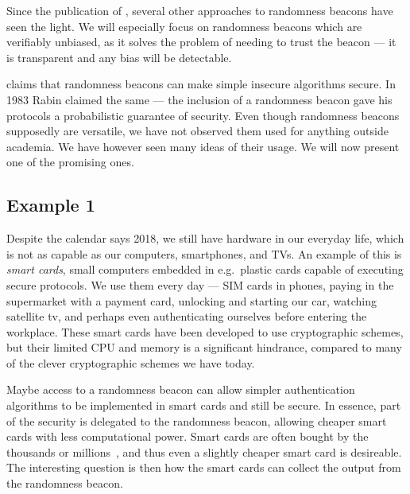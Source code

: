 Since the publication of , several other approaches to randomness beacons have seen the light.
We will especially focus on randomness beacons which are verifiably unbiased, as it solves the problem of needing to trust the beacon --- it is transparent and any bias will be detectable.

 claims that randomness beacons can make simple insecure algorithms secure.
In 1983 Rabin claimed the same --- the inclusion of a randomness beacon gave his protocols a probabilistic guarantee of security.
Even though randomness beacons supposedly are versatile, we have not observed them used for anything outside academia.
We have however seen many ideas of their usage. We will now present one of the promising ones.

\subsection{Example 1}

Despite the calendar says 2018, we still have
hardware in our everyday life, which is not as capable as our computers, smartphones, and TVs.
An example of this is \emph{smart cards}, small computers embedded in e.g.\ plastic cards capable of executing secure protocols.
We use them every day --- SIM cards in phones, paying in the supermarket with a payment card, unlocking and starting our car, watching satellite tv, and perhaps even authenticating ourselves before entering the workplace.
These smart cards have been developed to use cryptographic schemes, but their limited CPU and memory is a significant hindrance, compared to many of the clever cryptographic schemes we have today.

Maybe access to a randomness beacon can allow simpler authentication algorithms to be implemented in smart cards and still be secure.
In essence, part of the security is delegated to the randomness beacon, allowing cheaper smart cards with less computational power.
Smart cards are often bought by the thousands or millions~, and thus even a slightly cheaper smart card is desireable.
The interesting question is then how the smart cards can collect the output from the randomness beacon.



